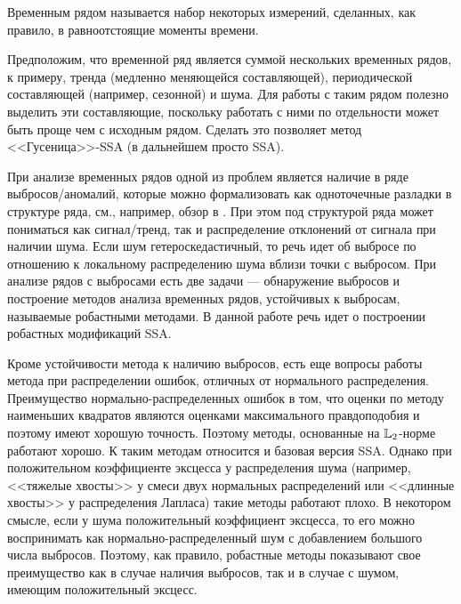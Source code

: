 \documentclass[specialist,
               substylefile = spbu.rtx,
               subf,href,colorlinks=true, 12pt]{disser}
\begin{document}
\tableofcontents

\intro
Временным рядом называется набор некоторых измерений, сделанных, как правило, в равноотстоящие моменты времени.

Предположим, что временной ряд является суммой нескольких временных рядов, к примеру, тренда (медленно меняющейся составляющей), периодической составляющей (например, сезонной) и шума. Для работы с таким рядом полезно выделить эти составляющие, поскольку работать с ними по отдельности может быть проще чем с исходным рядом. Сделать это позволяет метод <<Гусеница>>-SSA (в дальнейшем просто SSA).

При анализе временных рядов одной из проблем является наличие в ряде выбросов/аномалий, которые можно формализовать как одноточечные разладки в структуре ряда, см., например, обзор в \cite{BlazquezGarcia2022}. При этом под структурой ряда может пониматься как сигнал/тренд, так и распределение отклонений от сигнала при наличии шума. Если шум гетероскедастичный, то речь идет об выбросе по отношению к локальному распределению шума вблизи точки с выбросом. При анализе рядов с выбросами есть две задачи --- обнаружение выбросов и построение методов анализа временных рядов, устойчивых к выбросам, называемые робастными методами. В данной работе речь идет о построении робастных модификаций SSA.

Кроме устойчивости метода к наличию выбросов, есть еще вопросы работы метода при распределении ошибок, отличных от нормального распределения. Преимущество нормально-распределенных ошибок в том, что оценки по методу наименьших квадратов являются оценками максимального правдоподобия и поэтому имеют хорошую точность. Поэтому методы, основанные на $\mathbb{L}_2$-норме работают хорошо. К таким методам относится и базовая версия SSA. Однако при положительном коэффициенте эксцесса у распределения шума (например, <<тяжелые хвосты>> у смеси двух нормальных распределений или <<длинные хвосты>> у распределения Лапласа) такие методы работают плохо. В некотором смысле, если у шума положительный коэффициент эксцесса, то его можно воспринимать как нормально-распределенный шум с добавлением большого числа выбросов. Поэтому, как правило, робастные методы показывают свое преимущество как в случае наличия выбросов, так и в случае с шумом, имеющим положительный эксцесс.

\end{document}
